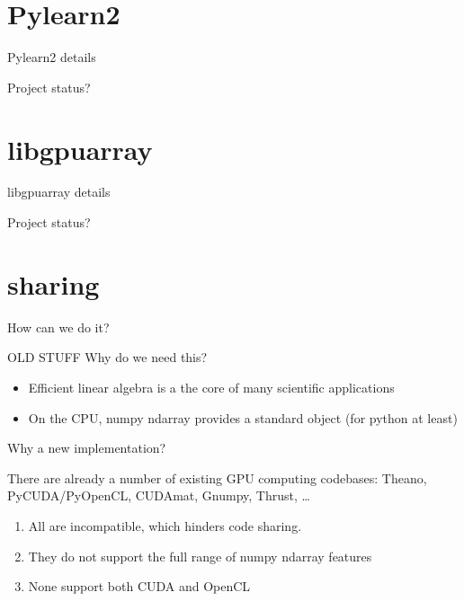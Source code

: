\documentclass[utf8x,xcolor=pdftex,dvipsnames,table]{beamer}
\begin{document}
\section{Pylearn2}
\begin{frame}{Pylearn2 details}
\end{frame}
\begin{frame}{Project status?}
\end{frame}

\section{libgpuarray}
\begin{frame}{libgpuarray details}
\end{frame}
\begin{frame}{Project status?}
\end{frame}

\section{sharing}
\begin{frame}{How can we do it?}
\end{frame}

\begin{frame}{OLD STUFF Why do we need this?}
\begin{itemize}
\item Efficient linear algebra is a the core of many scientific applications
\item On the CPU, numpy ndarray provides a standard object (for python at least)
\end{itemize}
\end{frame}

\begin{frame}{Why a new implementation?}
\begin{block}{There are already a number of existing GPU computing codebases:}
Theano, PyCUDA/PyOpenCL, CUDAmat, Gnumpy, Thrust, \ldots
\end {block}
\begin{enumerate}
\item<2-> All are incompatible, which hinders code sharing.
\item<3-> They do not support the full range of numpy ndarray features
\item<4-> None support both CUDA and OpenCL
\end{enumerate}
\end{frame}
\end{document}
